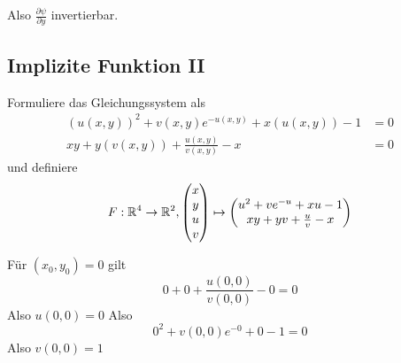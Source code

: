 \documentclass[sectionformat=aufgabe]{gadsescript}
\begin{document}
Also $ \frac{\partial \psi }{ \partial y }  $ invertierbar.

\subsection{Implizite Funktion II}
Formuliere das Gleichungssystem als
\begin{align*}
	( u(x, y) )^2 + v(x, y) e^{-u(x, y)} + x(u(x, y)) - 1 &= 0 \\
	xy + y(v(x, y)) + \frac{ u(x, y) }{ v(x, y) } - x &= 0
\end{align*}
und definiere
\[
	F: \mathbb{R} ^4 \to \mathbb{R} ^2,
	\begin{pmatrix} x \\ y \\ u \\ v \end{pmatrix}
	\mapsto
	\begin{pmatrix}
		u^2 + v e^{-u} + xu - 1 \\
		xy + yv + \frac{ u }{ v } - x
	\end{pmatrix} 
\]

Für $ (x_0, y_0) = 0 $ gilt
\[
	0 + 0 + \frac{ u(0, 0) }{ v(0, 0) } - 0 = 0
\]
Also $ u(0, 0) = 0 $
Also
\[
	0^2 + v(0, 0)e^{-0} + 0 - 1 = 0
\]
Also $ v(0, 0) = 1 $
\end{document}
